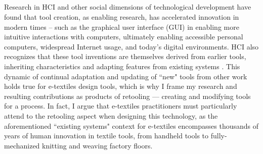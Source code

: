 

\subsection{}

Research in HCI and other social dimensions of technological development have found that tool creation, as enabling research, has accelerated innovation in modern times -- such as the graphical user interface (GUI) in enabling more intuitive interactions with computers, ultimately enabling accessible personal computers, widespread Internet usage, and today's digital environments. HCI also recognizes that these tool inventions are themselves derived from earlier tools, inheriting characteristics and adapting features from existing systems \cite{hudson_concepts_2014}. This dynamic of continual adaptation and updating of ``new" tools from other work holds true for e-textiles design tools, which is why I frame my research and resulting contributions as products of retooling --- creating and modifying tools for a process. In fact, I argue that e-textiles practitioners must particularly attend to the retooling aspect when designing this technology, as the aforementioned ``existing systems" context for e-textiles encompasses thousands of years of human innovation in textile tools, from handheld tools to fully-mechanized knitting and weaving factory floors.

